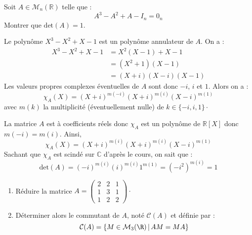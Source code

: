 \documentclass[a4paper,10pt]{report}
\begin{document}
\begin{Exercice}{} Soit $A \in \mathcal{M}_{n}(\mathbb{R})$ telle que :
  \[
  A^{3} - A^{2} + A - I_n = 0_n
  \]
Montrer que $\textrm{det}(A) = 1$.
\end{Exercice}

\corr Le polynôme $X^3-X^2+X-1$ est un polynôme annulateur de $A$. On a :
\begin{align*}
X^3-X^2+X-1 & = X^2(X-1)+X-1 \\
& = (X^2+1)(X-1) \\
& = (X+i)(X-i)(X-1)
\end{align*}
Les valeurs propres complexes éventuelles de $A$ sont donc $-i$, $i$ et $1$. Alors on a :
$$ \chi_A(X)= (X+i)^{m(-i)} (X+i)^{m(i)} (X-i)^{m(1)}$$
avec $m(k)$ la multiplicité (éventuellement nulle) de $k \in \lbrace -i, i ,1 \rbrace \cdot$

\medskip

\noindent La matrice $A$ est à coefficients réels donc $\chi_A$ est un polynôme de $\mathbb{R}[X]$ donc $m(-i)=m(i)$. Ainsi,
$$ \chi_A(X) = (X+i)^{m(i)} (X+i)^{m(i)} (X-i)^{m(1)}$$
Sachant que $\chi_A$ est scindé sur $\mathbb{C}$ d'après le cours, on sait que :
$$ \textrm{det}(A) = (-i)^{m(i)} (i)^{m(i)} 1^{m(1)} = (-i^2)^{m(i)} = 1$$

\begin{Exercice}{}
\begin{enumerate}
\item R\'eduire la matrice $A= \left(\begin{array}{rrr}  2 & 2 & 1\\
1 & 3 & 1\\
1 & 2 & 2 \end{array}\right) \cdot $\\
\item Déterminer alors le commutant de $A$, noté $\mathcal{C}(A)$ et définie par : 
$${\cal C}(A)=\{M\in{\cal M}_3(\R) \, \vert \, AM=MA\}$$
\end{enumerate}
\end{Exercice} 

\corr 
\end{document}
